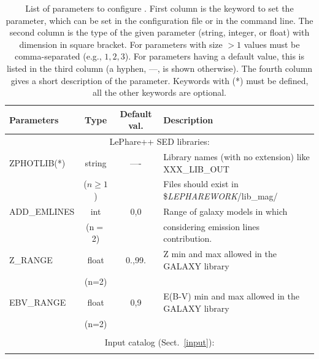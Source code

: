 \documentclass[12pt]{article}
\begin{document}
                          
 
 
\begin{table}
\caption{List of parameters to configure \lp. First column is the  keyword to set the parameter, which can be set in the configuration file or in the command line. The second column is the type  of the given parameter (string, integer, or float) with dimension in square bracket. For parameters with size $>1$ values must be comma-separated (e.g., $1,2,3$). For parameters having a default value, this is listed in the third column (a hyphen, ---, is shown otherwise).  The fourth column gives a short description of the parameter.   Keywords with (*) must be defined, all the other keywords are optional.  }

\begin{tabular}{lccl}
\\[0.5cm]
\textbf{Parameters}     & \textbf{Type}    & \textbf{Default val.} &  \textbf{Description}                                             \\[5pt]
\hline
\multicolumn{4}{c}{LePhare++  SED libraries:} \\[5pt]
\hline
%
ZPHOTLIB(*)   & string  &  ----   &  Library names   (with no extension) like  XXX\_LIB\_OUT         \\
                        & ($n \geq 1$) & & Files should exist in  \${\it LEPHAREWORK}/lib\_mag/         \\ 
%
%
ADD\_EMLINES  & int         & 0,0  &  Range of galaxy models in which     \\
                             &  (n$=$2) &        &  considering emission lines contribution.   \\
Z\_RANGE      & float &  0.,99.   &  Z min and max allowed in the GALAXY library  \\
                        & (n=2)&             &    \\
% 
EBV\_RANGE  & float &    0,9     &  E(B-V) min and max allowed  in the GALAXY library \\
                        & (n=2)&             &    \\

\hline\\[3pt]
\multicolumn{4}{c}{ Input catalog (Sect.~\ref{input}): } \\[3pt] \hline\\[3pt]


\end{tabular}
\end{table}
\end{document}
